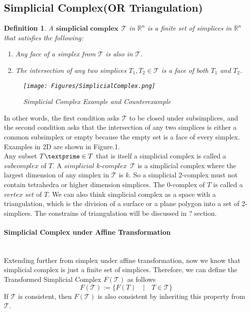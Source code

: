 \documentclass{article}
\newtheorem*{definition*}{Definition}
\begin{document}
    \subsection{Simplicial Complex(OR Triangulation)}
    \begin{definition*}
    A $\textbf{simplicial complex} ~~\mathcal T$ in $\mathbb{R}^n$ is a finite set of simplices in $\mathbb{R}^n$ that satisfies the following:
    \begin{enumerate}[label =\arabic*.]
      \item Any face of a simplex from $\mathcal{T}$ is also in $\mathcal{T}$.
      \item The intersection of any two simplices ${T}_1, {T}_2 \in \mathcal{T}$ is a face of both ${T}_1$ and  ${T}_2$.
    \end{enumerate}
    \begin{figure}[b]
    \centering
    \texttt{[image: Figures/SimplicialComplex.png]}
    \caption{Simplicial Complex Example and Counterexample}
    \end{figure}
    \end{definition*}
    In other words, the first condition asks $\mathcal{T}$ to be closed under subsimplices, and the second condition asks that the intersection of any two simplices is either a common subsimplex or empty because the empty set is a face of every simplex. Examples in 2D are shown in Figure.1. \\
    \indent
    Any subset ${T\textprime}\in{T}$ that is itself a simplicial complex is called a $\textit{subcomplex}$ of ${T}$. A $\textit{simplicial k-complex} ~~\mathcal T$ is a simplicial complex where the largest dimension of any simplex in $\mathcal T$ is ${k}$. So a simplicial 2-complex must not contain tetrahedra or higher dimension simplices. The 0-complex of ${T}$ is called a $\textit{vertex set}$ of ${T}$. We can also think simplicial complex as a space with a triangulation, which is the division of a surface or a plane polygon into a set of 2-simplices. The constrains of triangulation will be discussed in ? section.\\

    \paragraph{Simplicial Complex under Affine Transformation}\mbox{}\\
    Extending further from simplex under affine transformation, now we know that simplicial complex is just a finite set of simplices. Therefore, we can define the Transformed Simplicial Complex $F(\mathcal{T})$ as follows
    \begin{equation*}
    F(\mathcal{T}) := \{F(T) \quad \vert \quad T\in \mathcal{T}\}
    \end{equation*}
    If $\mathcal{T}$ is consistent, then $F(\mathcal{T})$ is also consistent by inheriting this property from $\mathcal{T}$.
\end{document}
